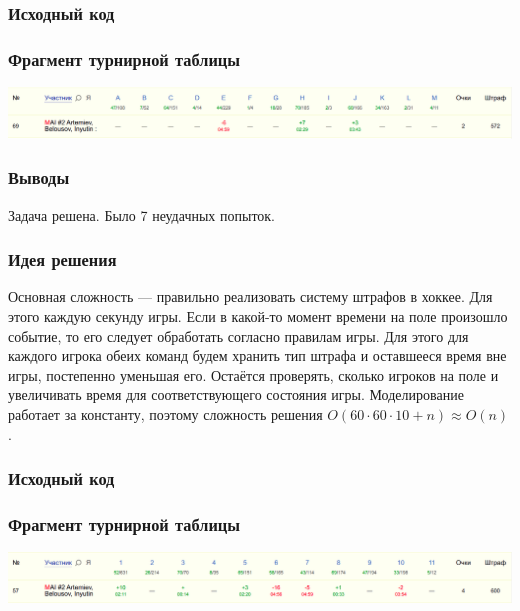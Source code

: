 \subsubsection*{Исходный код}

\subsubsection*{Фрагмент турнирной таблицы}
\includegraphics[width=\textwidth]{images/gp_korea.png}\newline\noindent
\subsubsection*{Выводы}
Задача решена. Было 7 неудачных попыток.
\pagebreak


\subsubsection*{Идея решения}
Основная сложность --- правильно реализовать систему штрафов в хоккее. Для этого каждую секунду игры. Если в какой-то момент времени на поле произошло событие, то его следует обработать согласно правилам игры. Для этого для каждого игрока обеих команд будем хранить тип штрафа и оставшееся время вне игры, постепенно уменьшая его. Остаётся проверять, сколько игроков на поле и увеличивать время для соответствующего состояния игры. Моделирование работает за константу, поэтому сложность решения $O(60 \cdot 60 \cdot 10 + n) \approx O(n)$.

\subsubsection*{Исходный код}

\subsubsection*{Фрагмент турнирной таблицы}
\includegraphics[width=\textwidth]{images/gp_siberia.png}\newline\noindent
